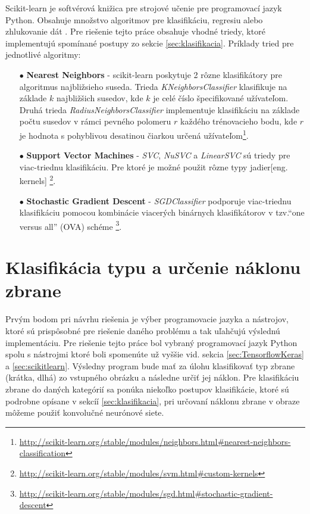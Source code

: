 Scikit-learn je softvérová knižica pre strojové učenie pre programovací jazyk Python.
Obsahuje množstvo algoritmov pre klasifikáciu, regresiu alebo zhlukovanie dát \cite{odkaz:scikitlearn}.
Pre riešenie tejto práce obsahuje vhodné triedy, ktoré implementujú spomínané postupy zo sekcie \ref{sec:klasifikacia}.
Príklady tried pre jednotlivé algoritmy:
\begin{enumerate}
    \item[$\bullet$] \textbf{Nearest Neighbors} - scikit-learn poskytuje 2 rôzne klasifikátory pre algoritmus najbližsieho suseda.
    Trieda \textit{KNeighborsClassifier} klasifikuje na základe $k$ najbližšich susedov, kde $k$ je celé číslo špecifikované užívateľom.
    Druhá trieda \textit{RadiusNeighborsClassifier} implementuje klasifikáciu na základe počtu susedov v rámci pevného polomeru $r$ každého trénovacieho bodu,
    kde $r$ je hodnota s pohyblivou desatinou čiarkou určená užívateľom\footnote{\url{http://scikit-learn.org/stable/modules/neighbors.html\#nearest-neighbors-classification}}.
    \item[$\bullet$] \textbf{Support Vector Machines} - \textit{SVC}, \textit{NuSVC} a \textit{LinearSVC} sú triedy pre viac-triednu klasifikáciu.
    Pre ktoré je možné použit rôzne typy jadier[eng. kernels] \footnote{\url{http://scikit-learn.org/stable/modules/svm.html\#custom-kernels}}.
    \item[$\bullet$] \textbf{Stochastic Gradient Descent} - \textit{SGDClassifier} podporuje viac-triednu klasifikáciu pomocou kombinácie viacerých binárnych klasifikátorov v tzv.“one versus all” (OVA) schéme \footnote{\url{http://scikit-learn.org/stable/modules/sgd.html\#stochastic-gradient-descent}}.
\end{enumerate}


\section{Klasifikácia typu a určenie náklonu zbrane}
Prvým bodom pri návrhu riešenia je výber programovacie jazyka a nástrojov, ktoré sú prispôsobné pre riešenie daného problému a tak uľahčujú výslednú implementáciu.
Pre riešenie tejto práce bol vybraný programovací jazyk Python spolu s nástrojmi ktoré boli spomenúte už vyššie vid. sekcia \ref{sec:TensorflowKeras} a \ref{sec:scikitlearn}.
Výsledny program bude mať za úlohu klasifikovať typ zbrane (krátka, dlhá) zo vstupného obrázku a následne určiť jej náklon.
Pre klasifikáciu zbrane do daných kategórií sa ponúka niekoľko postupov klasifikácie, ktoré sú podrobne opísane v sekcíí \ref{sec:klasifikacia},
    pri určovaní náklonu zbrane v obraze môžeme použiť konvolučné neurónové siete.






